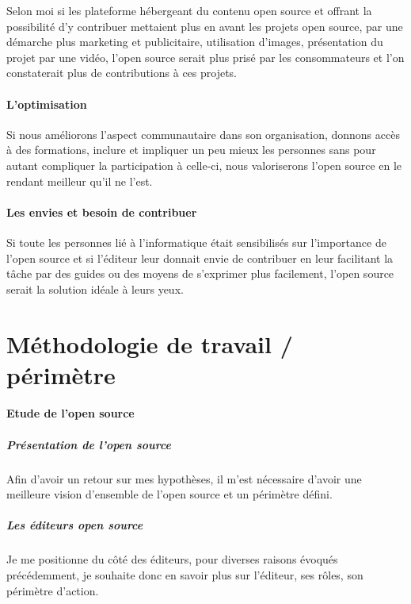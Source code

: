 			Selon moi si les plateforme hébergeant du contenu open source et offrant la possibilité d'y contribuer mettaient plus en avant les projets open source, par une démarche plus marketing et publicitaire, utilisation d'images, présentation du projet par une vidéo, l'open source serait plus prisé par les consommateurs et l'on constaterait plus de contributions à ces projets.

		\paragraph{L'optimisation\\}

			Si nous améliorons l'aspect communautaire dans son organisation, donnons accès à des formations, inclure et impliquer un peu mieux les personnes sans pour autant compliquer la participation à celle-ci, nous valoriserons l'open source en le rendant meilleur qu'il ne l'est.

		\paragraph{Les envies et besoin de contribuer\\}

			Si toute les personnes lié à l'informatique était sensibilisés sur l'importance de l'open source et si l'éditeur leur donnait envie de contribuer en leur facilitant la tâche par des guides ou des moyens de s'exprimer plus facilement, l'open source serait la solution idéale à leurs yeux.

	\section{Méthodologie de travail / périmètre}
		\paragraph{Etude de l'open source}

			\subparagraph{Présentation de l'open source\\}

				Afin d'avoir un retour sur mes hypothèses, il m'est nécessaire d'avoir une meilleure vision d'ensemble de l'open source et un périmètre défini.

			\subparagraph{Les éditeurs open source\\}

				Je me positionne du côté des éditeurs, pour diverses raisons évoqués précédemment, je souhaite donc en savoir plus sur l'éditeur, ses rôles, son périmètre d'action.

